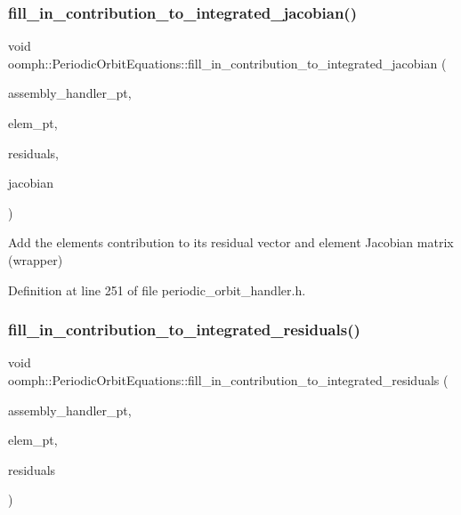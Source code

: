\subsubsection{\texorpdfstring{fill\+\_\+in\+\_\+contribution\+\_\+to\+\_\+integrated\+\_\+jacobian()}{fill\_in\_contribution\_to\_integrated\_jacobian()}}
{\footnotesize\ttfamily void oomph\+::\+Periodic\+Orbit\+Equations\+::fill\+\_\+in\+\_\+contribution\+\_\+to\+\_\+integrated\+\_\+jacobian (\begin{DoxyParamCaption}\item[{\hyperlink{classoomph_1_1PeriodicOrbitAssemblyHandlerBase}{Periodic\+Orbit\+Assembly\+Handler\+Base} $\ast$const \&}]{assembly\+\_\+handler\+\_\+pt,  }\item[{\hyperlink{classoomph_1_1GeneralisedElement}{Generalised\+Element} $\ast$const \&}]{elem\+\_\+pt,  }\item[{\hyperlink{classoomph_1_1Vector}{Vector}$<$ double $>$ \&}]{residuals,  }\item[{\hyperlink{classoomph_1_1DenseMatrix}{Dense\+Matrix}$<$ double $>$ \&}]{jacobian }\end{DoxyParamCaption})\hspace{0.3cm}{\ttfamily [inline]}}

Add the element\textquotesingle{}s contribution to its residual vector and element Jacobian matrix (wrapper) 

Definition at line 251 of file periodic\+\_\+orbit\+\_\+handler.\+h.

\mbox{\label{classoomph_1_1PeriodicOrbitEquations_a3b1aca3d26cf545636199b830a375b04}} 
\subsubsection{\texorpdfstring{fill\+\_\+in\+\_\+contribution\+\_\+to\+\_\+integrated\+\_\+residuals()}{fill\_in\_contribution\_to\_integrated\_residuals()}}
{\footnotesize\ttfamily void oomph\+::\+Periodic\+Orbit\+Equations\+::fill\+\_\+in\+\_\+contribution\+\_\+to\+\_\+integrated\+\_\+residuals (\begin{DoxyParamCaption}\item[{\hyperlink{classoomph_1_1PeriodicOrbitAssemblyHandlerBase}{Periodic\+Orbit\+Assembly\+Handler\+Base} $\ast$const \&}]{assembly\+\_\+handler\+\_\+pt,  }\item[{\hyperlink{classoomph_1_1GeneralisedElement}{Generalised\+Element} $\ast$const \&}]{elem\+\_\+pt,  }\item[{\hyperlink{classoomph_1_1Vector}{Vector}$<$ double $>$ \&}]{residuals }\end{DoxyParamCaption})\hspace{0.3cm}{\ttfamily [inline]}}



